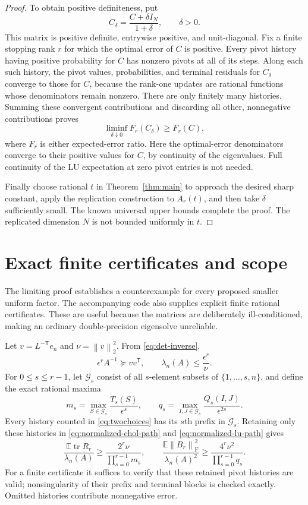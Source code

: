 \documentclass[11pt]{article}
\theoremstyle{remark}
\DeclareMathOperator{\tr}{tr}
\newcommand{\E}{\mathbb E}
\newcommand{\F}{\mathrm F}
\newcommand{\eps}{\epsilon}
\newcommand{\norm}[1]{\left\lVert#1\right\rVert}
\begin{document}
\begin{proof}
To obtain positive definiteness, put
\[
 C_\delta=\frac{C+\delta I_N}{1+\delta},\qquad \delta>0.
\]
This matrix is positive definite, entrywise positive, and unit-diagonal.
Fix a finite stopping rank $r$ for which the optimal error of $C$ is positive.
Every pivot history having positive probability for $C$ has nonzero pivots
at all of its steps. Along each such history, the pivot values, probabilities,
and terminal residuals for $C_\delta$ converge to those for $C$, because the
rank-one updates are rational functions whose denominators remain nonzero.
There are only finitely many histories. Summing these convergent contributions
and discarding all other, nonnegative contributions proves
\[
 \liminf_{\delta\downarrow0} F_r(C_\delta)\ge F_r(C),
\]
where $F_r$ is either expected-error ratio. Here the optimal-error denominators
converge to their positive values for $C$, by continuity of the eigenvalues.
Full continuity of the LU expectation at zero pivot entries is not needed.

Finally choose rational $t$ in Theorem~\ref{thm:main} to approach the desired
sharp constant, apply the replication construction to $A_r(t)$, and then
take $\delta$ sufficiently small. The known universal upper bounds complete
the proof. The replicated dimension $N$ is not bounded uniformly in $t$.
\end{proof}

\section{Exact finite certificates and scope}

The limiting proof establishes a counterexample for every proposed smaller
uniform factor. The accompanying code also supplies explicit finite rational
certificates. These are useful because the matrices are deliberately
ill-conditioned, making an ordinary double-precision eigensolve unreliable.

Let $v=L^{-\mathsf T}e_n$ and $\nu=\norm v_2^2$. From
\eqref{eq:det-inverse},
\[
 \eps^r A^{-1}\succeq vv^{\mathsf T},\qquad
 \lambda_n(A)\le\frac{\eps^r}{\nu}.
\]
For $0\le s\le r-1$, let $\mathcal G_s$ consist of all $s$-element subsets
of $\{1,\ldots,s,n\}$, and define the exact rational maxima
\[
 m_s=\max_{S\in\mathcal G_s}\frac{T_s(S)}{\eps^s},\qquad
 q_s=\max_{I,J\in\mathcal G_s}\frac{Q_s(I,J)}{\eps^{2s}}.
\]
Every history counted in \eqref{eq:twochoices} has its $s$th prefix in
$\mathcal G_s$. Retaining only these histories in
\eqref{eq:normalized-chol-path} and \eqref{eq:normalized-lu-path} gives
\begin{equation}\label{eq:cert}
 \frac{\E\tr R_r}{\lambda_n(A)}\ge
 \frac{2^r\nu}{\prod_{s=0}^{r-1}m_s},\qquad
 \frac{\E\norm{B_r}_{\F}^2}{\lambda_n(A)^2}\ge
 \frac{4^r\nu^2}{\prod_{s=0}^{r-1}q_s}.
\end{equation}
For a finite certificate it suffices to verify that these retained pivot
histories are valid; nonsingularity of their prefix and terminal blocks is
checked exactly. Omitted histories contribute nonnegative error.
\end{document}
